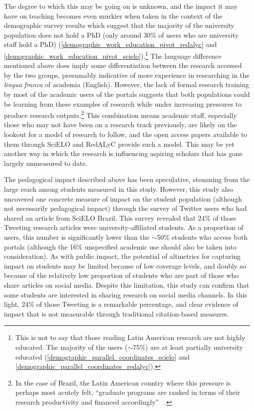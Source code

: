 The degree to which this may be going on is unknown, and the impact it may have on teaching becomes even murkier when taken in the context of the demographic survey results which suggest that the majority of the university population does not hold a PhD (only around 30\% of users who are university staff hold a PhD) (\autoref{demographic_work_education_pivot_redalyc} and \autoref{demographic_work_education_pivot_scielo}).\footnote{This is not to say that those reading Latin American research are not highly educated. The majority of the users (\ensuremath{\sim}75\%) are at least partially university educated (\autoref{demographic_parallel_coordinates_scielo} and \autoref{demographic_parallel_coordinates_redalyc}).} The language difference mentioned above does imply some differentiation between the research accessed by the two groups, presumably indicative of more experience in researching in the \emph{lingua franca} of academia (English). However, the lack of formal research training by most of the academic users of the portals suggests that both populations could be learning from these examples of research while under increasing pressures to produce research outputs.\footnote{In the case of Brazil, the Latin American country where this pressure is perhaps most acutely felt, ``graduate programs are ranked in terms of their research productivity and financed accordingly'' ~\citep[p. xvii]{Altbach2009a}.} This combination means academic staff, especially those who may not have been on a research track previously, are likely on the lookout for a model of research to follow, and the open access papers available to them through SciELO and RedALyC provide such a model. This may be yet another way in which the research is influencing aspiring scholars that has gone largely unmeasured to date.

The pedagogical impact described above has been speculative, stemming from the large reach among students measured in this study. However, this study also uncovered one concrete measure of impact on the student population (although not necessarily pedagogical impact) through the survey of Twitter users who had shared an article from SciELO Brazil. This survey revealed that 24\% of those Tweeting research articles were university-affiliated students. As a proportion of users, this number is significantly lower than the \ensuremath{\sim}50\% students who access both portals (although the 16\% unspecified academic use should also be taken into consideration). As with public impact, the potential of altmetrics for capturing impact on students may be limited because of low coverage levels, and doubly so because of the relatively low proportion of students who are part of those who share articles on social media. Despite this limitation, this study can confirm that some students are interested in sharing research on social media channels. In this light, 24\% of those Tweeting is a remarkable percentage, and clear evidence of impact that is not measurable through traditional citation-based measures.

